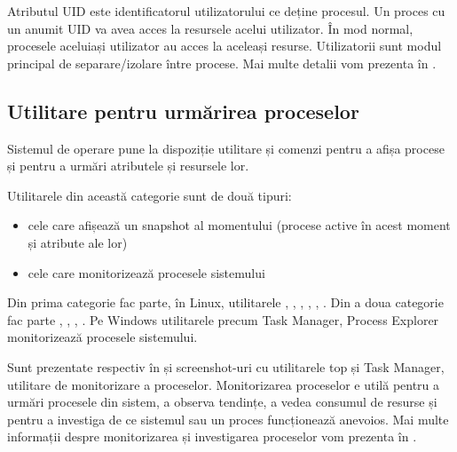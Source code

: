 
Atributul UID  este identificatorul utilizatorului ce
deține procesul. Un proces cu un anumit UID va avea acces la resursele acelui
utilizator. În mod normal, procesele aceluiași utilizator au acces la aceleași
resurse. Utilizatorii sunt modul principal de separare/izolare între procese.
Mai multe detalii vom prezenta în .

\subsection{Utilitare pentru urmărirea proceselor}
\label{sec:process-resurse-monitorizare}

Sistemul de operare pune la dispoziție utilitare și comenzi pentru a afișa
procese și pentru a urmări atributele și resursele lor.

Utilitarele din această categorie sunt de două tipuri:

\begin{itemize}
	\item cele care afișează un snapshot al momentului (procese active în
		acest moment și atribute ale lor)
	\item cele care monitorizează procesele sistemului
\end{itemize}

Din prima categorie fac parte, în Linux, utilitarele , , , ,
, . Din a doua categorie fac parte , , , . Pe Windows
utilitarele precum Task Manager, Process Explorer monitorizează procesele
sistemului.

Sunt prezentate respectiv în  și  screenshot-uri cu utilitarele top și Task Manager, utilitare de monitorizare a proceselor. Monitorizarea
proceselor e utilă pentru a urmări procesele din sistem, a observa tendințe, a
vedea consumul de resurse și pentru a investiga de ce sistemul sau un proces
funcționează anevoios. Mai multe informații despre monitorizarea și investigarea
proceselor vom prezenta în .

